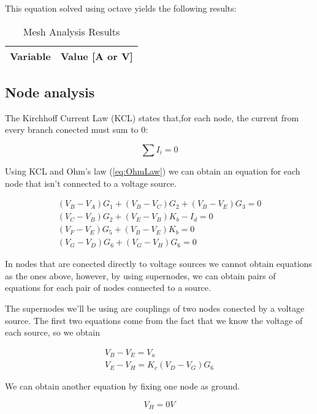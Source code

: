 This equation solved using octave yields the following results:

\begin{table}[H]
    \centering
    \begin{tabular}{|l|r|}
      \hline    
      {\bf Variable} & {\bf Value [A or V]} \\ \hline
      
    \end{tabular}
    \caption{Mesh Analysis Results}
    \label{tab:meshA}
  \end{table}

\subsection{Node analysis}
The Kirchhoff Current Law (KCL) states that,for each node, the current from every branch conected must sum to 0:

\begin{equation}
  \sum I_i = 0
  \label{eq:KCL}
\end{equation}


Using KCL and Ohm's law (\ref{eq:OhmLaw}) we can obtain an equation for each node that isn't connected to a voltage source.

\begin{align}
  (V_B-V_A)G_1+(V_B-V_C)G_2+(V_B-V_E)G_3=0\\
  (V_C-V_B)G_2+(V_E-V_B)K_b-I_d=0\\
  (V_F-V_E)G_5+(V_B-V_E)K_b=0\\
  (V_G-V_D)G_6+(V_G-V_H)G_6=0
  \label{eq:nodos}
\end{align}


In nodes that are conected directly to voltage sources we cannot obtain equations as the ones above, however, by using supernodes, we can obtain pairs of equations for each pair of nodes connected to a source.
\par
The supernodes we'll be using are couplings of two nodes conected by a voltage source. The first two equations come from the fact that we know the voltage of each source, so we obtain

 \begin{align}
  V_B-V_E=V_a\\
  V_E-V_H=K_c(V_D-V_G)G_6
  \label{eq:supenodosV}
\end{align}

We can obtain another equation by fixing one node as ground.

 \begin{equation}
  V_H = 0V
  \label{eq:supenodosGND}
\end{equation}


